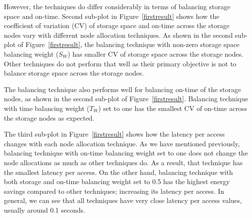 However, the techniques do differ considerably in terms of balancing storage space and on-time. Second sub-plot in
Figure~\ref{firstresult} shows how the coefficient of variation (CV) of storage space and on-time across the storage nodes
vary with different node allocation techniques. As shown in the second sub-plot of Figure~\ref{firstresult}, the
balancing technique with non-zero storage space balancing weight ($S_W$) has smaller CV
of storage space across the storage nodes. Other techniques do not perform that well as their primary objective
is not to balance storage space across the storage nodes.

The balancing technique also performs well for balancing on-time of the storage nodes, as shown in the second sub-plot
of Figure~\ref{firstresult}. Balancing technique with time balancing weight ($T_W$) set to one has the smallest CV
of on-time across the storage nodes as expected.

The third sub-plot in Figure~\ref{firstresult} shows how the latency per access changes with each node allocation technique.
As we have mentioned previously, balancing technique with on-time balancing weight set to one does not change the node
allocations as much as other techniques do. As a result, that technique has the smallest latency per access. On the
other hand, balancing technique with both storage and on-time balancing weight set to 0.5 has the highest energy savings
compared to other techniques; increasing its latency per access. In general, we can see that all techniques have very
close latency per access values, usually around 0.1 seconds. 

